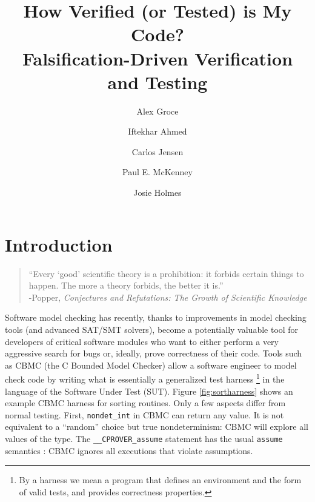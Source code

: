 \documentclass{svjour3}
\begin{document}
\title{How Verified (or Tested) is My Code?\\Falsification-Driven
  Verification and Testing}

\author{Alex Groce \and Iftekhar Ahmed \and Carlos Jensen \and Paul
  E. McKenney \and Josie Holmes}

\maketitle


\begin{abstract}

\end{abstract}

\section{Introduction}


\begin{quote}
``Every `good' scientific theory is a prohibition: it forbids certain things to happen. The 
more a theory forbids, the better it is.''\\
-Popper, \emph{Conjectures and Refutations: The Growth of 
  Scientific Knowledge} \cite{popperconjectures}
\end{quote}

Software model checking \cite{ModelChecking} has recently, thanks to
improvements in model checking tools (and advanced SAT/SMT solvers), become
a potentially valuable tool for developers of critical software
modules who want to either perform a very aggressive search for
bugs or, ideally, prove correctness of their code.  Tools such as
CBMC \cite{CBMCp} (the C Bounded Model Checker) allow a software
engineer to model check code by writing what is essentially a
generalized test harness \cite{woda12,woda08}\footnote{By a harness we mean a program that
  defines an environment and the form of valid tests, and provides
  correctness properties.} in the language of the Software Under Test
(SUT).  Figure \ref{fig:sortharness} shows an example CBMC harness for
sorting routines.  Only a few aspects differ from normal testing.
First, {\tt nondet\_int} in CBMC can return any value.  It is
not equivalent to a ``random'' choice but true nondeterminism: CBMC
will explore all values of the type.  The {\tt \_\_CPROVER\_assume}
statement has the usual
{\tt assume} semantics \cite{EWD:Discipline,exploit}: CBMC ignores
all executions that violate assumptions.
\end{document}
